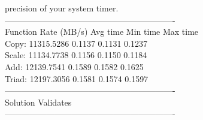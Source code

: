 \begin{itemize}
{precision of your system timer. \\
------------------------------------------------------------- \\
Function      Rate (MB/s)   Avg time     Min time     Max time \\
Copy:       11315.5286       0.1137       0.1131       0.1237 \\
Scale:      11134.7738       0.1156       0.1150       0.1184 \\
Add:        12139.7541       0.1589       0.1582       0.1625 \\
Triad:      12197.3056       0.1581       0.1574       0.1597 \\
------------------------------------------------------------- \\
Solution Validates \\
-------------------------------------------------------------
    }
    
    \newpage
    

\end{itemize}
